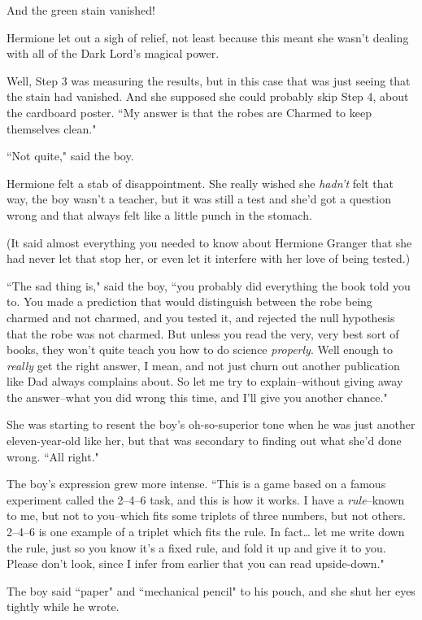 And the green stain vanished!

Hermione let out a sigh of relief, not least because this meant she wasn't dealing with all of the Dark Lord's magical power.

Well, Step 3 was measuring the results, but in this case that was just seeing that the stain had vanished. And she supposed she could probably skip Step 4, about the cardboard poster. ``My answer is that the robes are Charmed to keep themselves clean."

``Not quite," said the boy.

Hermione felt a stab of disappointment. She really wished she \emph{hadn't} felt that way, the boy wasn't a teacher, but it was still a test and she'd got a question wrong and that always felt like a little punch in the stomach.

(It said almost everything you needed to know about Hermione Granger that she had never let that stop her, or even let it interfere with her love of being tested.)

``The sad thing is," said the boy, ``you probably did everything the book told you to. You made a prediction that would distinguish between the robe being charmed and not charmed, and you tested it, and rejected the null hypothesis that the robe was not charmed. But unless you read the very, very best sort of books, they won't quite teach you how to do science \emph{properly}. Well enough to \emph{really} get the right answer, I mean, and not just churn out another publication like Dad always complains about. So let me try to explain\---without giving away the answer\---what you did wrong this time, and I'll give you another chance."

She was starting to resent the boy's oh-so-superior tone when he was just another eleven-year-old like her, but that was secondary to finding out what she'd done wrong. ``All right."

The boy's expression grew more intense. ``This is a game based on a famous experiment called the 2--4--6 task, and this is how it works. I have a \emph{rule}\---known to me, but not to you\---which fits some triplets of three numbers, but not others. 2--4--6 is one example of a triplet which fits the rule. In fact{\ldots} let me write down the rule, just so you know it's a fixed rule, and fold it up and give it to you. Please don't look, since I infer from earlier that you can read upside-down."

The boy said ``paper" and ``mechanical pencil" to his pouch, and she shut her eyes tightly while he wrote.

